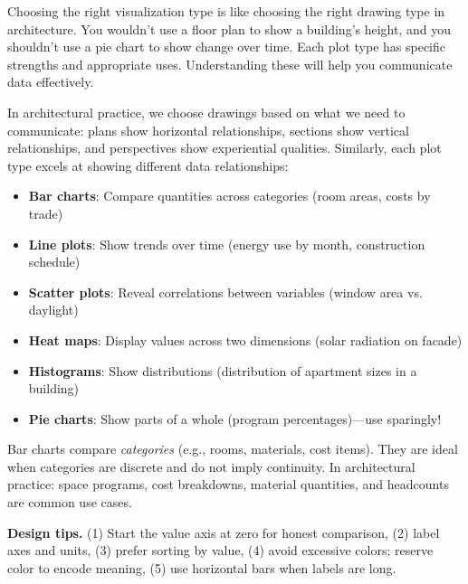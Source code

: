 

Choosing the right visualization type is like choosing the right drawing type in architecture. You wouldn't use a floor plan to show a building's height, and you shouldn't use a pie chart to show change over time. Each plot type has specific strengths and appropriate uses. Understanding these will help you communicate data effectively.

In architectural practice, we choose drawings based on what we need to communicate: plans show horizontal relationships, sections show vertical relationships, and perspectives show experiential qualities. Similarly, each plot type excels at showing different data relationships:

\begin{itemize}
\item \textbf{Bar charts}: Compare quantities across categories (room areas, costs by trade)
\item \textbf{Line plots}: Show trends over time (energy use by month, construction schedule)
\item \textbf{Scatter plots}: Reveal correlations between variables (window area vs. daylight)
\item \textbf{Heat maps}: Display values across two dimensions (solar radiation on facade)
\item \textbf{Histograms}: Show distributions (distribution of apartment sizes in a building)
\item \textbf{Pie charts}: Show parts of a whole (program percentages)---use sparingly!
\end{itemize}



Bar charts compare \emph{categories} (e.g., rooms, materials, cost items). They are ideal when categories are discrete and do not imply continuity. In architectural practice: space programs, cost breakdowns, material quantities, and headcounts are common use cases.

\textbf{Design tips.} (1) Start the value axis at zero for honest comparison, (2) label axes and units, (3) prefer sorting by value, (4) avoid excessive colors; reserve color to encode meaning, (5) use horizontal bars when labels are long.

